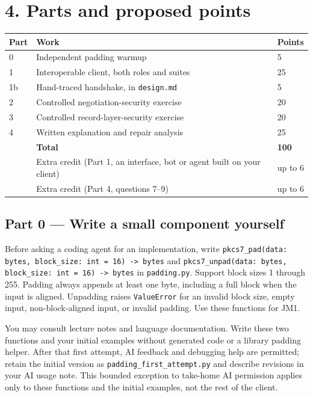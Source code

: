 \documentclass[11pt]{article}
\begin{document}
\section*{4. Parts and proposed points}

\begin{center}\small
\begin{tabular}{p{0.58in}p{3.74in}p{0.69in}}
\toprule
\textbf{Part} & \textbf{Work} & \textbf{Points} \\
\midrule
0 & Independent padding warmup & 5 \\
1 & Interoperable client, both roles and suites & 25 \\
1b & Hand-traced handshake, in \texttt{design.md} & 5 \\
2 & Controlled negotiation-security exercise & 20 \\
3 & Controlled record-layer-security exercise & 20 \\
4 & Written explanation and repair analysis & 25 \\
 & \textbf{Total} & \textbf{100} \\
 & Extra credit (Part 1, an interface, bot or agent built on your client) & up to 6 \\
 & Extra credit (Part 4, questions 7--9) & up to 6 \\
\bottomrule
\end{tabular}
\end{center}

\subsection*{Part 0 --- Write a small component yourself}

Before asking a coding agent for an implementation, write \texttt{pkcs7\_\allowbreak{}pad(data: bytes, block\_\allowbreak{}size: int = 16) -{}> bytes} and \texttt{pkcs7\_\allowbreak{}unpad(data: bytes, block\_\allowbreak{}size: int = 16) -{}> bytes} in \texttt{padding.py}. Support block sizes 1 through 255. Padding always appends at least one byte, including a full block when the input is aligned. Unpadding raises \texttt{ValueError} for an invalid block size, empty input, non-block-aligned input, or invalid padding. Use these functions for JM1.

You may consult lecture notes and language documentation. Write these two functions and your initial examples without generated code or a library padding helper. After that first attempt, AI feedback and debugging help are permitted; retain the initial version as \texttt{padding\_\allowbreak{}first\_\allowbreak{}attempt.\allowbreak{}py} and describe revisions in your AI usage note. This bounded exception to take-home AI permission applies only to these functions and the initial examples, not the rest of the client.
\end{document}
